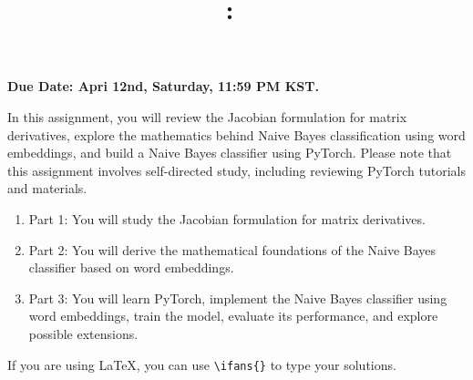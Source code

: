 \documentclass[answers]{exam}
\title{
\vspace{-1in}
\textmd{\textbf{\hmwkClass:\ \hmwkTitle}}
}
\author{}
\date{}
\newif\ifanswers
\newcommand{\ifans}[1]{\ifanswers \color{red} \textbf{Solution: } #1 \color{black} \fi}
\begin{document}
\maketitle
\vspace{-3em}

\textbf{Due Date: Apri 12nd, Saturday, 11:59 PM KST.}

In this assignment, you will review the Jacobian formulation for matrix derivatives, explore the mathematics behind Naive Bayes classification using word embeddings, and build a Naive Bayes classifier using PyTorch.
Please note that this assignment involves self-directed study, including reviewing PyTorch tutorials and materials.
\begin{enumerate}
    \item Part 1: You will study the Jacobian formulation for matrix derivatives.
    \item Part 2: You will derive the mathematical foundations of the Naive Bayes classifier based on word embeddings.
    \item	Part 3: You will learn PyTorch, implement the Naive Bayes classifier using word embeddings, train the model, evaluate its performance, and explore possible extensions.
\end{enumerate}
If you are using LaTeX, you can use \verb!\ifans{}! to type your solutions.

\begin{questions}
    
    \newpage
    
    \newpage
    
\end{questions}


\end{document}
